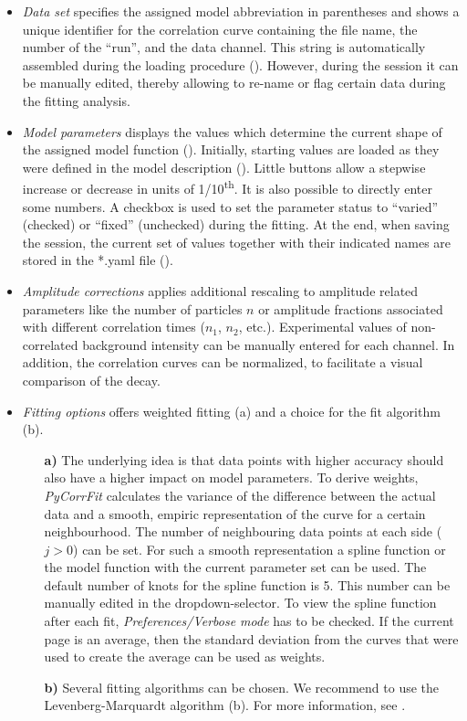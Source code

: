 \begin{itemize}
\item \textit{Data set} specifies the assigned model abbreviation in parentheses and shows a unique identifier for the correlation curve containing the file name, the number of the ``run'', and the data channel. This string is automatically assembled during the loading procedure (). However, during the session it can be manually edited, thereby allowing to re-name or flag certain data during the fitting analysis.
\item \textit{Model parameters} displays the values which determine the current shape of the assigned model function (). Initially, starting values are loaded as they were defined in the model description (). Little buttons allow a stepwise increase or decrease in units of 1/10\textsuperscript{th}. It is also possible to directly enter some numbers. A checkbox is used to set the parameter status to ``varied'' (checked) or ``fixed'' (unchecked) during the fitting. At the end, when saving the session, the current set of values together with their indicated names are stored in the *.yaml file (). 
\item \textit{Amplitude corrections} applies additional rescaling to amplitude related parameters like the number of particles $n$ or amplitude fractions associated with different correlation times ($n_1$, $n_2$, etc.). Experimental values of non-correlated background intensity can be manually entered for each channel. In addition, the correlation curves can be normalized, to facilitate a visual comparison of the decay.
\item \textit{Fitting options} offers weighted fitting (a) and a choice for the fit algorithm (b).
\begin{itemize}
\item[\textbf{a)}] The underlying idea is that data points with higher accuracy should also have a higher impact on model parameters. To derive weights, \textit{PyCorrFit} calculates the variance of the difference between the actual data and a smooth, empiric representation of the curve for a certain neighbourhood. The number of neighbouring data points at each side ($j > 0$) can be set. For such a smooth representation a  spline function or the model function with the current parameter set can be used. The default number of knots for the spline function is 5. This number can be manually edited in the dropdown-selector. To view the spline function after each fit, \textit{Preferences/Verbose mode} has to be checked. If the current page is an average, then the standard deviation from the curves that were used to create the average can be used as weights.
\item[\textbf{b)}] Several fitting algorithms can be chosen. We recommend to use the Levenberg-Marquardt algorithm (b). For more information, see .
\end{itemize}
\end{itemize}
